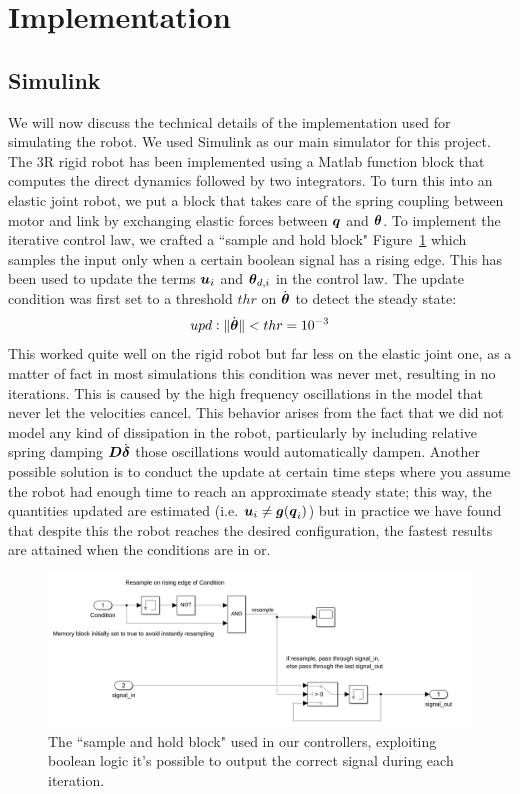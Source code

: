 \section{Implementation}
\subsection{Simulink}
We will now discuss the technical details of the implementation used for simulating the robot. We used Simulink as our main simulator for this project. The 3R rigid robot has been implemented using a Matlab function block that computes the direct dynamics followed by two integrators. To turn this into an elastic joint robot, we put a block that takes care of the spring coupling between motor and link by exchanging elastic forces between ${\boldsymbol{q}}$ and $\boldsymbol{\theta}$. To implement the iterative control law, we crafted a ``sample and hold block" Figure~\ref{sandh} which samples the input only when a certain boolean signal has a rising edge. This has been used to update the terms $\boldsymbol{u}_i$ and $\boldsymbol{\theta}_{d,i}$ in the control law. The update condition was first set to a threshold $thr$ on $\dot{\boldsymbol{\theta}}$ to detect the steady state:
\[
    upd : \| \dot{\boldsymbol{\theta}} \| < thr = 10^{-3}
\]
This worked quite well on the rigid robot but far less on the elastic joint one, as a matter of fact in most simulations this condition was never met, resulting in no iterations. This is caused by the high frequency oscillations in the model that never let the velocities cancel. This behavior arises from the fact that we did not model any kind of dissipation in the robot, particularly by including relative spring damping $\boldsymbol{D}\dot{\boldsymbol{\delta}}$ those oscillations would automatically dampen. Another possible solution is to conduct the update at certain time steps where you assume the robot had enough time to reach an approximate steady state; this way, the quantities updated are estimated (i.e. $\boldsymbol{u}_i \neq \boldsymbol{g}({\boldsymbol{q}}_i) $) but in practice we have found that despite this the robot reaches the desired configuration, the fastest results are attained when the conditions are in or.

\begin{figure}[h!]
\centerline{\includegraphics[scale=0.4]{figures/sampleandhold.png}}
\caption{\label{sandh}
The ``sample and hold block" used in our controllers, exploiting boolean logic it's possible to output the correct signal during each iteration.}
\end{figure}
